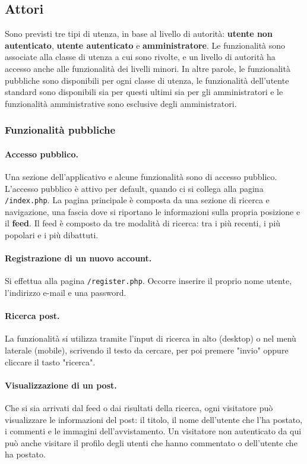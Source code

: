 \documentclass[12pt, a4paper]{article}
\begin{document}
    \subsection{Attori}
    Sono previsti tre tipi di utenza, in base al livello di autorità: \textbf{utente non autenticato}, \textbf{utente autenticato} e \textbf{amministratore}. Le funzionalità sono associate alla classe di utenza a cui sono rivolte, e un livello di autorità ha accesso anche alle funzionalità dei livelli minori. In altre parole, le funzionalità pubbliche sono disponibili per ogni classe di utenza, le funzionalità dell'utente standard sono disponibili sia per questi ultimi sia per gli amministratori e le funzionalità amministrative sono esclusive degli amministratori.

    \subsubsection{Funzionalità pubbliche}

    \paragraph{Accesso pubblico.} Una sezione dell'applicativo e alcune funzionalità sono di accesso pubblico. L'accesso pubblico è attivo per default, quando ci si collega alla pagina \texttt{/index.php}. La pagina principale è composta da una sezione di ricerca e navigazione, una fascia dove si riportano le informazioni sulla propria posizione e il \textbf{feed}. Il feed è composto da tre modalità di ricerca: tra i più recenti, i più popolari e i più dibattuti.

    \paragraph{Registrazione di un nuovo account.} Si effettua alla pagina \texttt{/register.php}. Occorre inserire il proprio nome utente, l'indirizzo e-mail e una password.

    \paragraph{Ricerca post.} La funzionalità si utilizza tramite l'input di ricerca in alto (desktop) o nel menù laterale (mobile), scrivendo il testo da cercare, per poi premere "invio" oppure cliccare il tasto "ricerca".

    \paragraph{Visualizzazione di un post.} Che si sia arrivati dal feed o dai risultati della ricerca, ogni visitatore può visualizzare le informazioni del post: il titolo, il nome dell'utente che l'ha postato, i commenti e le immagini dell'avvistamento. Un visitatore non autenticato da qui può anche visitare il profilo degli utenti che hanno commentato o dell'utente che ha postato.
\end{document}
